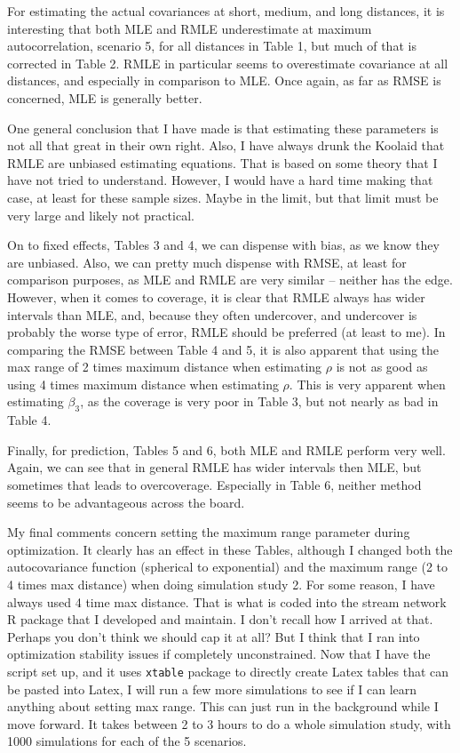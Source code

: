 \documentclass[12pt, titlepage]{article}
\begin{document}
For estimating the actual covariances at short, medium, and long distances, it is interesting that both MLE and RMLE underestimate at maximum autocorrelation, scenario 5, for all distances in Table 1, but much of that is corrected in Table 2.  RMLE in particular seems to overestimate covariance at all distances, and especially in comparison to MLE.  Once again, as far as RMSE is concerned, MLE is generally better.

One general conclusion that I have made is that estimating these parameters is not all that great in their own right.  Also, I have always drunk the Koolaid that RMLE are unbiased estimating equations.  That is based on some theory that I have not tried to understand.  However, I would have a hard time making that case, at least for these sample sizes.  Maybe in the limit, but that limit must be very large and likely not practical.

On to fixed effects, Tables 3 and 4, we can dispense with bias, as we know they are unbiased.  Also, we can pretty much dispense with RMSE, at least for comparison purposes, as MLE and RMLE are very similar -- neither has the edge.  However, when it comes to coverage, it is clear that RMLE always has wider intervals than MLE, and, because they often undercover, and undercover is probably the worse type of error, RMLE should be preferred (at least to me).  In comparing the RMSE between Table 4 and 5, it is also apparent that using the max range of 2 times maximum distance when estimating $\rho$ is not as good as using 4 times maximum distance when estimating $\rho$.  This is very apparent when estimating $\beta_3$, as the coverage is very poor in Table 3, but not nearly as bad in Table 4.

Finally, for prediction, Tables 5 and 6, both MLE and RMLE perform very well.  Again, we can see that in general RMLE has wider intervals then MLE, but sometimes that leads to overcoverage.  Especially in Table 6, neither method seems to be advantageous across the board.

My final comments concern setting the maximum range parameter during optimization.  It clearly has an effect in these Tables, although I changed both the autocovariance function (spherical to exponential) and the maximum range (2 to 4 times max distance) when doing simulation study 2.  For some reason, I have always used 4 time max distance.  That is what is coded into the stream network R package that I developed and maintain.  I don't recall how I arrived at that.  Perhaps you don't think we should cap it at all?  But I think that I ran into optimization stability issues if completely unconstrained.  Now that I have the script set up, and it uses \texttt{xtable} package to directly create Latex tables that can be pasted into Latex, I will run a few more simulations to see if I can learn anything about setting max range.  This can just run in the background while I move forward.  It takes between 2 to 3 hours to do a whole simulation study, with 1000 simulations for each of the 5 scenarios.
\end{document}
